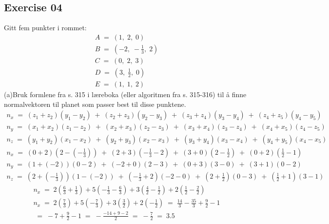 \documentclass[12pt, a4paper]{article}
\begin{document}
\subsection*{Exercise 04}
Gitt fem punkter i rommet:
	\begin{gather}
		\tag*{}
			A\;=\;(1,\;2,\;0)\\
		\tag*{}
			B\;=\;\left(-2,\;-\frac{1}{3},\;2\right)\\
		\tag*{}
			C\;=\;(0,\;2,\;3)\\
		\tag*{}
			D\;=\;\left(3,\;\frac{1}{2},\;0\right)\\
		\tag*{}
			E\;=\;(1,\;1,\;2)
	\end{gather}
	(a)\quad Bruk formlene fra s. 315 i læreboka (eller
	algoritmen fra s. 315-316) til å finne normalvektoren til
	planet som passer best til disse punktene.
			\begin{gather}
				\tag*{}
					n_x\;=\;(z_1+z_2)(y_1-y_2)\;+\;
						(z_2+z_3)(y_2-y_3)\;+\;
						(z_3+z_4)(y_3-y_4)\;+\;
						(z_4+z_5)(y_4-y_5)\\
				\tag*{}
					n_y\;=\;(x_1+x_2)(z_1-z_2)\;+\;
						(x_2+x_3)(z_2-z_3)\;+\;
						(x_3+x_4)(z_3-z_4)\;+\;
						(x_4+x_5)(z_4-z_5)\\
				\tag*{}
					n_z\;=\;(y_1+y_2)(x_1-x_2)\;+\;
						(y_2+y_3)(x_2-x_3)\;+\;
						(y_3+y_4)(x_3-x_4)\;+\;
						(y_4+y_5)(x_4-x_5)
			\end{gather}
			\begin{gather}
				\tag*{}
					n_x\;=\;
						(0+2)\left(2-\left(-\frac{1}{3}
							\right)\right)\;+\;
						(2+3)\left(-\frac{1}{3}-2\right)\;+\;
						(3+0)\left(2-\frac{1}{2}\right)\;+\;
						(0+2)\left(\frac{1}{2}-1\right)\\
				\tag*{}
					n_y\;=\;
						(1+(-2))(0-2)\;+\;
						(-2+0)(2-3)\;+\;
						(0+3)(3-0)\;+\;
						(3+1)(0-2)\\
				\tag*{}
					n_z\;=\;
						\left(2+\left(-\frac{1}{3}\right)\right)
							(1-(-2))\;+\;
						\left(-\frac{1}{3}+2\right)(-2-0)\;+\;
						\left(2+\frac{1}{2}\right)(0-3)\;+\;
						\left(\frac{1}{2}+1\right)(3-1)
			\end{gather}
			\begin{gather}
				\tag*{}
					n_x\;=\;2\left(\frac{6}{3}+\frac{1}{3}
					\right)+5\left(-\frac{1}{3}-\frac{6}{3}
					\right)+3\left(\frac{4}{2}-\frac{1}{2}
					\right)+2\left(\frac{1}{2}-\frac{2}{2}
					\right)\\
				\tag*{}
					n_x\;=\;2\left(\frac{7}{3}\right)+
					5\left(-\frac{7}{3}\right)+
					3\left(\frac{3}{2}\right)+
					2\left(-\frac{1}{2}\right)
					\;=\;\frac{14}{3}-\frac{35}{3}+
					\frac{9}{2}-1\\
				\tag*{}
					\;=\;-7+\frac{9}{2}-1
					\;=\;-\frac{-14+9-2}{2}\;=\;-\frac{7}{2}
					\;=\;3.5
			\end{gather}
\end{document}
